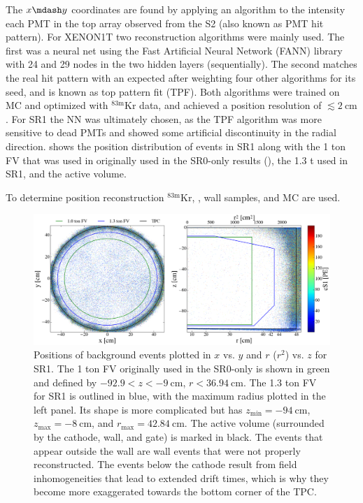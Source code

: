 The $x \mdash y$ coordinates are found by applying an algorithm to the intensity each PMT in the top array observed from the S2 (also known as
PMT hit pattern).  For XENON1T two reconstruction algorithms were mainly used.  The first was a neural net using the Fast Artificial
Neural Network (FANN) library with 24 and 29 nodes in the two hidden layers (sequentially).  The second matches the real hit pattern with
an expected after weighting four other algorithms for its seed, and is known as top pattern fit (TPF).  Both algorithms were trained on MC
and optimized with $\mathrm{^{83m}Kr}$ data, and achieved a position resolution of $\lesssim 2\ \mathrm{cm}$.  For SR1 the NN was ultimately
chosen, as the TPF algorithm was more sensitive to dead PMTs and showed some artificial discontinuity in the radial
direction.   shows the position distribution of events in SR1 along with the 1 ton FV
that was used in originally used in the SR0-only results (), the 1.3 t used in SR1, and the active volume.

To determine position reconstruction $\mathrm{^{83m}Kr}$, , wall samples, and MC are used.

\begin{figure}
\centering
\includegraphics[width=\textwidth]{FVBoth}
\caption{Positions of background events plotted in $x$ vs. $y$ and $r$ ($r^2$) vs. $z$ for SR1.  The 1 ton FV originally used
in the SR0-only is shown in green and defined by $-92.9 < z < -9\ \mathrm{cm}$, $r < 36.94\ \mathrm{cm}$.  The 1.3 ton FV for SR1 is
outlined in
blue, with the maximum radius plotted in the left panel.  Its shape is more complicated but has $z_\mathrm{min} = -94\ \mathrm{cm}$,
$z_{\mathrm{max}} = -8\ \mathrm{cm}$, and $r_{\mathrm{max}} = 42.84\ \mathrm{cm}$.  The active volume (surrounded by the cathode, wall,
and gate) is marked in black.  The events that appear outside the wall are wall events that were not properly
reconstructed.  The events below the cathode result from field inhomogeneities that lead to extended drift times, which is why they
become more exaggerated towards the bottom corner of the TPC.}
\label{fig:calibrations_position_reconstruction}
\end{figure}

